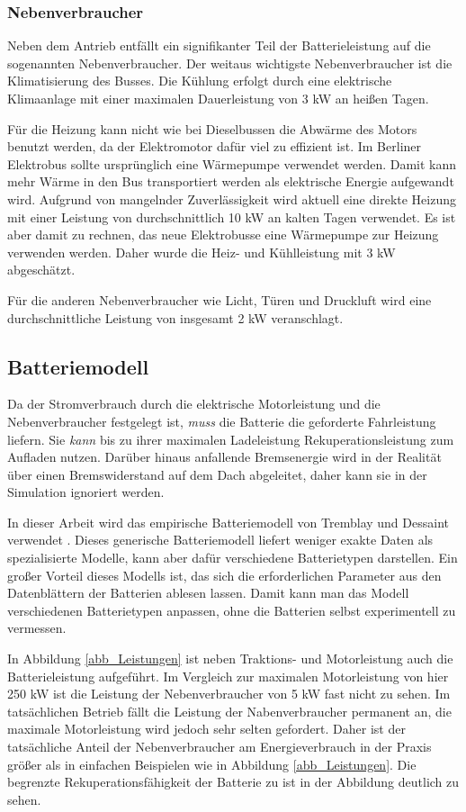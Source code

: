 \subsubsection{Nebenverbraucher}
Neben dem Antrieb entfällt ein signifikanter Teil der Batterieleistung auf die sogenannten Nebenverbraucher. Der weitaus wichtigste Nebenverbraucher ist die Klimatisierung des Busses. Die Kühlung erfolgt durch eine elektrische Klimaanlage mit einer maximalen Dauerleistung von 3 kW an heißen Tagen.

Für die Heizung kann nicht wie bei Dieselbussen die Abwärme des Motors benutzt werden, da der Elektromotor dafür viel zu effizient ist. Im Berliner Elektrobus sollte ursprünglich eine Wärmepumpe verwendet werden. Damit kann mehr Wärme in den Bus transportiert werden als elektrische Energie aufgewandt wird. Aufgrund von mangelnder Zuverlässigkeit wird aktuell eine direkte Heizung mit einer Leistung von durchschnittlich 10 kW an kalten Tagen verwendet. Es ist aber damit zu rechnen, das neue Elektrobusse eine Wärmepumpe zur Heizung verwenden werden. Daher wurde die Heiz- und Kühlleistung mit 3 kW abgeschätzt.

Für die anderen Nebenverbraucher wie Licht, Türen und Druckluft wird eine durchschnittliche Leistung von insgesamt 2 kW veranschlagt.

\subsection{Batteriemodell}
Da der Stromverbrauch durch die elektrische Motorleistung und die Nebenverbraucher festgelegt ist, \emph{muss} die Batterie die geforderte Fahrleistung liefern. Sie \emph{kann} bis zu ihrer maximalen Ladeleistung Rekuperationsleistung zum Aufladen nutzen. Darüber hinaus anfallende Bremsenergie wird in der Realität über einen Bremswiderstand auf dem Dach abgeleitet, daher kann sie in der Simulation ignoriert werden.

In dieser Arbeit wird das empirische Batteriemodell von Tremblay und Dessaint verwendet \cite{tremblay2009experimental}. Dieses generische Batteriemodell liefert weniger exakte Daten als spezialisierte Modelle, kann aber dafür verschiedene Batterietypen darstellen. Ein großer Vorteil dieses Modells ist, das sich die erforderlichen Parameter aus den Datenblättern der Batterien ablesen lassen. Damit kann man das Modell verschiedenen Batterietypen anpassen, ohne die Batterien selbst experimentell zu vermessen.

In Abbildung \ref{abb_Leistungen} ist neben Traktions- und Motorleistung auch die Batterieleistung aufgeführt. Im Vergleich zur maximalen Motorleistung von hier 250 kW ist die Leistung der Nebenverbraucher von 5 kW fast nicht zu sehen. Im tatsächlichen Betrieb fällt die Leistung der Nabenverbraucher permanent an, die maximale Motorleistung wird jedoch sehr selten gefordert. Daher ist der tatsächliche Anteil der Nebenverbraucher am Energieverbrauch in der Praxis größer als in einfachen Beispielen wie in Abbildung \ref{abb_Leistungen}. Die begrenzte Rekuperationsfähigkeit der Batterie zu ist in der Abbildung deutlich zu sehen.


